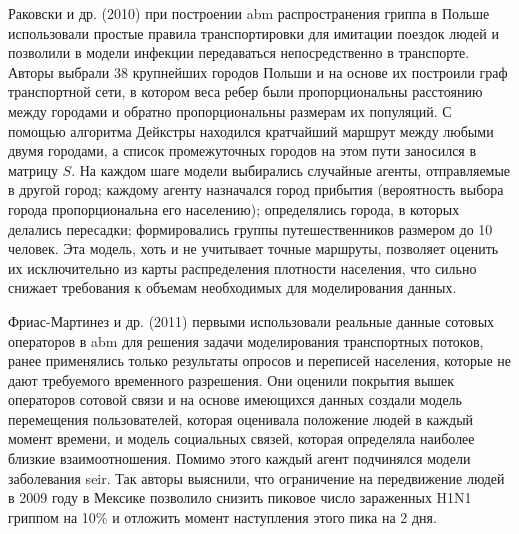 \documentclass[a4paper,12pt]{article} %
\begin{document}
Раковски и др. (2010) \cite{rakowski2010influenza} при построении \gls{abm} распространения гриппа в Польше использовали простые правила транспортировки для имитации поездок людей и позволили в модели инфекции передаваться непосредственно в транспорте. Авторы выбрали 38 крупнейших городов Польши и на основе их построили граф транспортной сети, в котором веса ребер были пропорциональны расстоянию между городами и обратно пропорциональны размерам их популяций. С помощью алгоритма Дейкстры находился кратчайший маршрут между любыми двумя городами, а список промежуточных городов на этом пути заносился в матрицу $S$. На каждом шаге модели выбирались случайные агенты, отправляемые в другой город; каждому агенту назначался город прибытия (вероятность выбора города пропорциональна его населению); определялись города, в которых делались пересадки; формировались группы путешественников размером до 10 человек. Эта модель, хоть и не учитывает точные маршруты, позволяет оценить их исключительно из карты распределения плотности населения, что сильно снижает требования к объемам необходимых для моделирования данных.

Фриас-Мартинез и др. (2011) \cite{frias2011agent} первыми использовали реальные данные сотовых операторов в \gls{abm} для решения задачи моделирования транспортных потоков, ранее применялись только результаты опросов и переписей населения, которые не дают требуемого временного разрешения. Они оценили покрытия вышек операторов сотовой связи и на основе имеющихся данных создали модель перемещения пользователей, которая оценивала положение людей в каждый момент времени, и модель социальных связей, которая определяла наиболее близкие взаимоотношения. Помимо этого каждый агент подчинялся модели заболевания \gls{seir}. Так авторы выяснили, что ограничение на передвижение людей в 2009 году в Мексике позволило снизить пиковое число зараженных H1N1 гриппом на 10\% и отложить момент наступления этого пика на 2 дня.
\end{document}
